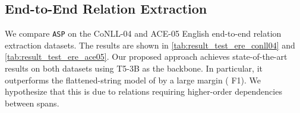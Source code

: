 \documentclass[11pt]{article}
\newcommand*{\asp}{\texttt{ASP}}
\begin{document}
\begin{table}[t]
\centering
{} 
\caption{Test F1 scores of named entity recognition on the CoNLL-03  test set.}
\label{tab:result_test_ner_conll03}
\end{table} 
\subsection{End-to-End Relation Extraction} 
We compare \asp{} on the CoNLL-04 and ACE-05 English end-to-end relation extraction datasets.
The results are shown in \cref{tab:result_test_ere_conll04} and \cref{tab:result_test_ere_ace05}.
Our proposed approach achieves state-of-the-art results on both datasets using T5-3B as the backbone.
In particular, it outperforms the flattened-string model of \citet{tanl} by a large margin ( F1).
We hypothesize that this is due to relations requiring higher-order dependencies between spans. 


\begin{table}[ht]
\centering
{} 
\caption{\textbf{Micro} F1 scores of entity extraction and relation extraction on the CoNLL-04 joint entity relation extraction test set.}
\label{tab:result_test_ere_conll04}
\end{table}
\end{document}
